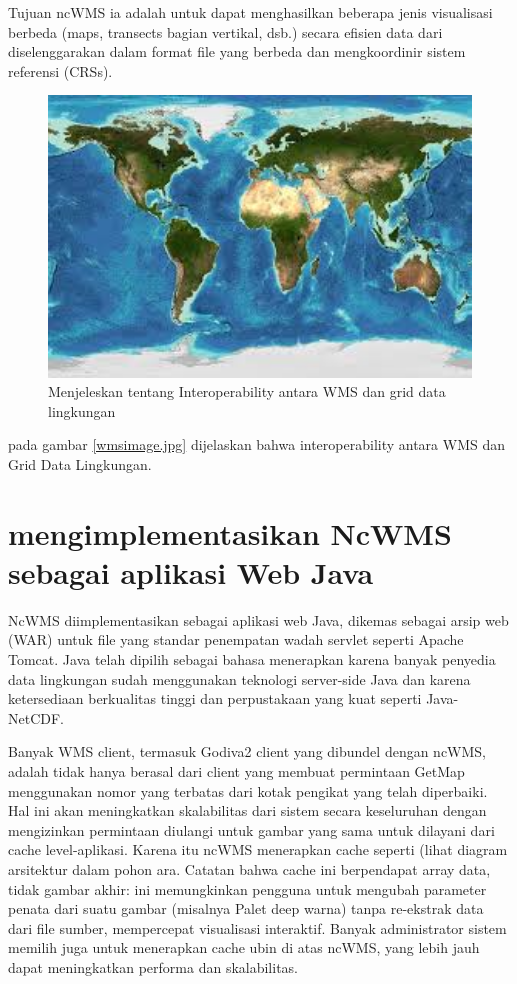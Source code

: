 Tujuan ncWMS ia adalah untuk dapat menghasilkan beberapa jenis visualisasi berbeda (maps, transects bagian vertikal, dsb.) secara
efisien data dari diselenggarakan dalam format file yang berbeda dan mengkoordinir sistem referensi (CRSs).
\begin{figure}[ht]
\centerline{\includegraphics[width=1\textwidth]{figures/wmsimage.jpg}}
\caption{Menjeleskan tentang Interoperability antara WMS dan grid data lingkungan}	
\label{Web Map Service}
\end{figure}
pada gambar \ref{wmsimage.jpg} dijelaskan bahwa interoperability antara WMS dan Grid Data Lingkungan.

\section{mengimplementasikan NcWMS sebagai aplikasi Web Java}
NcWMS diimplementasikan sebagai aplikasi web Java, dikemas sebagai arsip web (WAR) untuk file yang standar penempatan wadah servlet
seperti Apache Tomcat. Java telah dipilih sebagai bahasa menerapkan karena banyak penyedia data lingkungan sudah menggunakan teknologi
server-side Java dan karena ketersediaan berkualitas tinggi dan perpustakaan yang kuat seperti Java-NetCDF.

Banyak WMS client, termasuk Godiva2 client yang dibundel dengan ncWMS, adalah tidak hanya berasal dari client yang membuat permintaan
GetMap menggunakan nomor yang terbatas dari kotak pengikat yang telah diperbaiki. Hal ini akan meningkatkan skalabilitas dari sistem
secara keseluruhan dengan mengizinkan permintaan diulangi untuk gambar yang sama untuk dilayani dari cache level-aplikasi. Karena itu
ncWMS menerapkan cache seperti (lihat diagram arsitektur dalam pohon ara.  Catatan bahwa cache ini berpendapat array data, tidak gambar
akhir: ini memungkinkan pengguna untuk mengubah parameter penata dari suatu gambar (misalnya Palet deep warna) tanpa re-ekstrak data
dari file sumber, mempercepat visualisasi interaktif. Banyak administrator sistem memilih juga untuk menerapkan cache ubin di atas
ncWMS, yang lebih jauh dapat meningkatkan performa dan skalabilitas.

